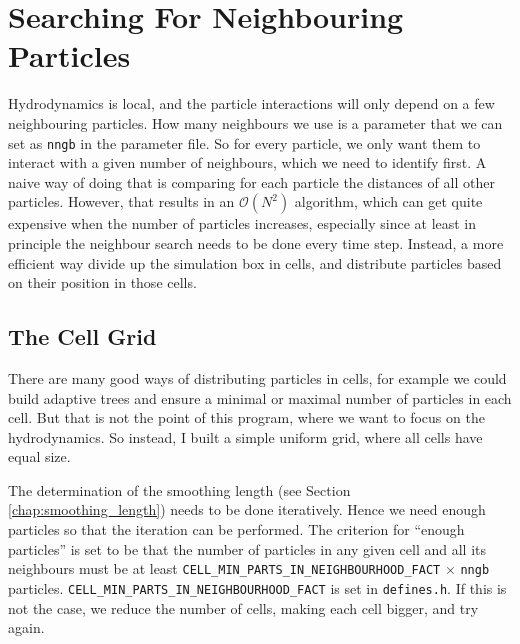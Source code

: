 \newpage
\section{Searching For Neighbouring Particles}\label{chap:neighboursearch}



Hydrodynamics is local, and the particle interactions will only depend on a few neighbouring particles.
How many neighbours we use is a parameter that we can set as \texttt{nngb} in the parameter file.
So for every particle, we only want them to interact with a given number of neighbours, which we need to identify first.
A naive way of doing that is comparing for each particle the distances of all other particles.
However, that results in an $\mathcal{O}(N^2)$ algorithm, which can get quite expensive when the number of particles increases, especially since at least in principle the neighbour search needs to be done every time step.
Instead, a more efficient way divide up the simulation box in cells, and distribute particles based on their position in those cells.









\subsection{The Cell Grid}

There are many good ways of distributing particles in cells, for example we could build adaptive trees and ensure a minimal or maximal number of particles in each cell.
But that is not the point of this program, where we want to focus on the hydrodynamics.
So instead, I built a simple uniform grid, where all cells have equal size.

The determination of the smoothing length (see Section \ref{chap:smoothing_length}) needs to be done iteratively.
Hence we need enough particles so that the iteration can be performed.
The criterion for ``enough particles'' is set to be that the number of particles in any given cell and all its neighbours must be at least \texttt{CELL_MIN_PARTS_IN_NEIGHBOURHOOD_FACT} $\times$ \texttt{nngb} particles.
\texttt{CELL_MIN_PARTS_IN_NEIGHBOURHOOD_FACT} is set in \texttt{defines.h}.
If this is not the case, we reduce the number of cells, making each cell bigger, and try again.







